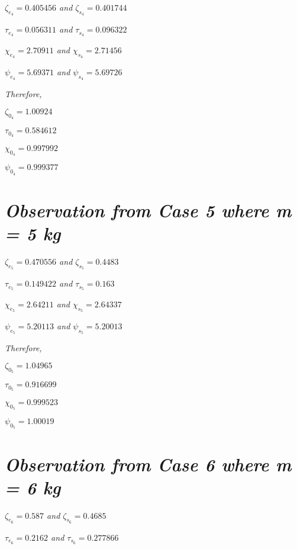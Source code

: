     \textit{$\zeta_{e_4} = 0.405456$ and $\zeta_{s_4} = 0.401744$}
            
    \textit{$\tau_{e_4} = 0.056311$ and $\tau_{s_4} = 0.096322$}
            
    \textit{$\chi_{e_4} = 2.70911$ and $\chi_{s_4} = 2.71456$}
            
    \textit{$\psi_{e_4} = 5.69371$ and $\psi_{s_4} = 5.69726$}
            
    \textit{Therefore,}
            
    $\zeta_{0_4} = 1.00924$
            
    $\tau_{0_4} = 0.584612$
            
    $\chi_{0_4} = 0.997992$
            
    $\psi_{0_4} = 0.999377$    
            
        
        
\section{\textit{Observation from Case 5 where m = 5 kg}}
        
    \textit{$\zeta_{e_5} = 0.470556$ and $\zeta_{s_5} = 0.4483$}
            
    \textit{$\tau_{e_5} = 0.149422$ and $\tau_{s_5} = 0.163$}
            
    \textit{$\chi_{e_5} = 2.64211$ and $\chi_{s_5} = 2.64337$}
            
    \textit{$\psi_{e_5} = 5.20113$ and $\psi_{s_5} = 5.20013$}
                
    \textit{Therefore,}
            
    $\zeta_{0_5} = 1.04965$
            
    $\tau_{0_5} = 0.916699$
            
    $\chi_{0_5} = 0.999523$
            
    $\psi_{0_5} = 1.00019$    
            
        
        
\section{\textit{Observation from Case 6 where m = 6 kg}}
        
    \textit{$\zeta_{e_6} = 0.587$ and $\zeta_{s_6} = 0.4685$}
            
    \textit{$\tau_{e_6} = 0.2162$ and $\tau_{s_6} = 0.277866$}
            
